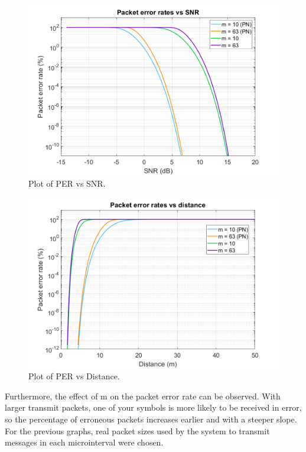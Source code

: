 \documentclass[journal]{IEEEtran}	%
\begin{document}
\begin{figure}[H]
\centering
\includegraphics[width=0.99\columnwidth]{snr2.png}
\caption{Plot of PER vs SNR.}
\label{fig:snr}
\end{figure}

\begin{figure}[H]
\centering
\includegraphics[width=0.99\columnwidth]{distance2.png}
\caption{Plot of PER vs Distance.}
\label{fig:distance}
\end{figure}

Furthermore, the effect of m on the packet error rate can be observed. With larger transmit packets, one of your symbols is more likely to be received in error, so the percentage of erroneous packets increases earlier and with a steeper slope. For the previous graphs, real packet sizes used by the system to transmit messages in each microinterval were chosen.
\end{document}
